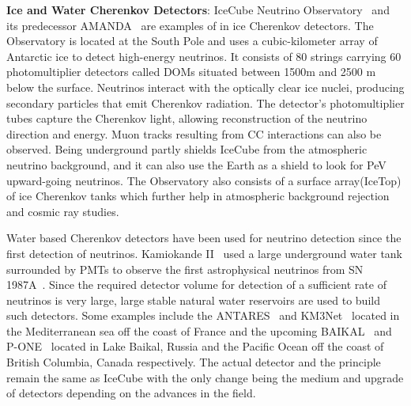 \begin{description}
  \item \textbf{Ice and Water Cherenkov Detectors}: IceCube Neutrino Observatory~\cite{} and its predecessor AMANDA~\cite{} are examples of in ice Cherenkov detectors. The Observatory is located at the South Pole and uses a cubic-kilometer array of Antarctic ice to detect high-energy neutrinos. It consists of 80 strings carrying 60 photomultiplier detectors called DOMs situated between 1500m and 2500 m below the surface. Neutrinos interact with the optically clear ice nuclei, producing secondary particles that emit Cherenkov radiation. The detector's photomultiplier tubes capture the Cherenkov light, allowing reconstruction of the neutrino direction and energy. Muon tracks resulting from CC interactions can also be observed. Being underground partly shields IceCube from the atmospheric neutrino background, and it can also use the Earth as a shield to look for PeV upward-going neutrinos. The Observatory also consists of a surface array(IceTop) of ice Cherenkov tanks which further help in atmospheric background rejection and cosmic ray studies. 
  
  Water based Cherenkov detectors have been used for neutrino detection since the first detection of neutrinos. Kamiokande II~\cite{} used a large underground water tank surrounded by PMTs to observe the first astrophysical neutrinos from SN 1987A~\cite{}. Since the required detector volume for detection of a sufficient rate of neutrinos is very large, large stable natural water reservoirs are used to build such detectors. Some examples include the ANTARES~\cite{} and KM3Net~\cite{} located in the Mediterranean sea off the coast of France and the upcoming BAIKAL~\cite{} and P-ONE~\cite{} located in Lake Baikal, Russia and the Pacific Ocean off the coast of British Columbia, Canada respectively. The actual detector and the principle remain the same as IceCube with the only change being the medium and upgrade of detectors depending on the advances in the field. 
  

\end{description}
